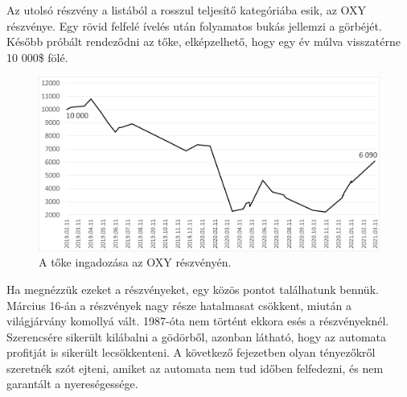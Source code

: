 Az utolsó részvény a listából a rosszul teljesítő kategóriába esik, az OXY részvénye. Egy rövid felfelé ívelés után folyamatos bukás jellemzi a görbéjét. Később próbált rendeződni az tőke, elképzelhető, hogy egy év múlva visszatérne 10 000\$ fölé.
\begin{figure}[ht]
\centering
\includegraphics[width=\textwidth]{images/OXY_MONEY.png}
\caption{A tőke ingadozása az OXY részvényén.}
\label{fig:OXY_MONEY}
\end{figure}

Ha megnézzük ezeket a részvényeket, egy közös pontot találhatunk bennük. Március 16-án a részvények nagy része hatalmasat csökkent, miután a világjárvány komollyá vált. 1987-óta nem történt ekkora esés a részvényeknél. Szerencsére sikerült kilábalni a gödörből, azonban látható, hogy az automata profitját is sikerült lecsökkenteni. A következő fejezetben olyan tényezőkről szeretnék szót ejteni, amiket az automata nem tud időben felfedezni, és nem garantált a nyereségessége.
